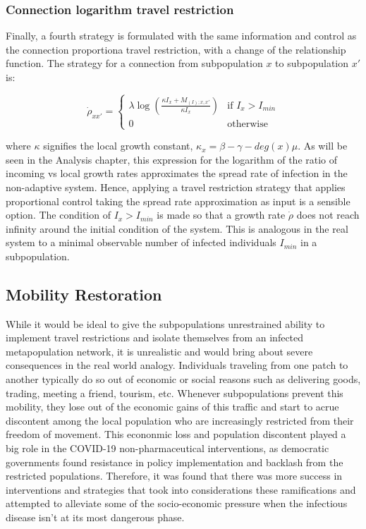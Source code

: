 \subsubsection{Connection logarithm travel restriction}

Finally, a fourth strategy is formulated with the same information and control as the connection proportiona travel restriction, with a change of the relationship function. The strategy for a connection from subpopulation $x$ to subpopulation $x'$ is:

\begin{equation}
    \dot{\rho}_{xx'} = 
    \begin{cases} 
    \lambda \log\left(\frac{\kappa I_{x} + M_{(I);x,x'}}{\kappa I_{x}}\right) & \text{if } I_{x} > I_{min} \\ 
    0 & \text{otherwise}
    \end{cases}
\end{equation}

where $\kappa$ signifies the local growth constant, $\kappa_x = \beta-\gamma- deg(x) \mu$. As will be seen in the Analysis chapter, this expression for the logarithm of the ratio of incoming vs local growth rates approximates the spread rate of infection in the non-adaptive system. Hence, applying a travel restriction strategy that applies proportional control taking the spread rate approximation as input is a sensible option. The condition of $I_{x} > I_{min}$ is made so that a growth rate $\dot \rho$ does not reach infinity around the initial condition of the system. This is analogous in the real system to a minimal observable number of infected individuals $I_{min}$ in a subpopulation.

\subsection{Mobility Restoration}
While it would be ideal to give the subpopulations unrestrained ability to implement travel restrictions and isolate themselves from an infected metapopulation network, it is unrealistic and would bring about severe consequences in the real world analogy. Individuals traveling from one patch to another typically do so out of economic or social reasons such as delivering goods, trading, meeting a friend, tourism, etc. Whenever subpopulations prevent this mobility, they lose out of the economic gains of this traffic and start to acrue discontent among the local population who are increasingly restricted from their freedom of movement. This econonmic loss and population discontent played a big role in the COVID-19 non-pharmaceutical interventions, as democratic governments found resistance in policy implementation and backlash from the restricted populations. Therefore, it was found that there was more success in interventions and strategies that took into considerations these ramifications and attempted to alleviate some of the socio-economic pressure when the infectious disease isn't at its most dangerous phase. \\

